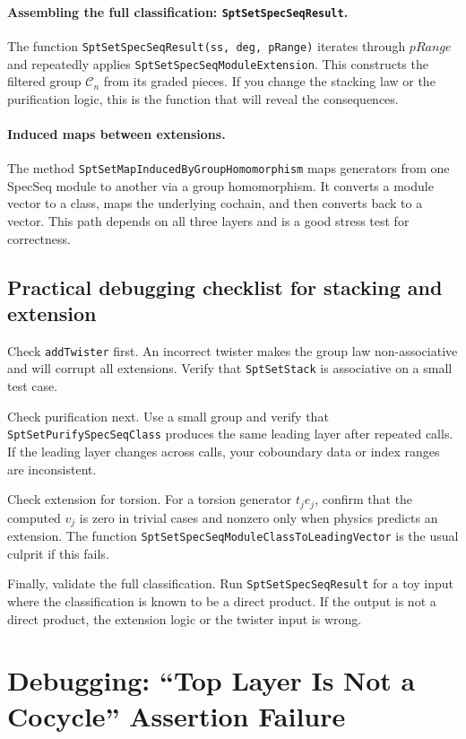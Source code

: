 \documentclass{SciPost}
\begin{document}
\paragraph{Assembling the full classification: \texttt{SptSetSpecSeqResult}.}
The function \texttt{SptSetSpecSeqResult(ss, deg, pRange)} iterates through $pRange$ and repeatedly applies \texttt{SptSetSpecSeqModuleExtension}.
This constructs the filtered group $\mathcal{C}_n$ from its graded pieces.
If you change the stacking law or the purification logic, this is the function that will reveal the consequences.

\paragraph{Induced maps between extensions.}
The method \texttt{SptSetMapInducedByGroupHomomorphism} maps generators from one SpecSeq module to another via a group homomorphism.
It converts a module vector to a class, maps the underlying cochain, and then converts back to a vector.
This path depends on all three layers and is a good stress test for correctness.

\subsection{Practical debugging checklist for stacking and extension}

Check \texttt{addTwister} first.
An incorrect twister makes the group law non-associative and will corrupt all extensions.
Verify that \texttt{SptSetStack} is associative on a small test case.

Check purification next.
Use a small group and verify that \texttt{SptSetPurifySpecSeqClass} produces the same leading layer after repeated calls.
If the leading layer changes across calls, your coboundary data or index ranges are inconsistent.

Check extension for torsion.
For a torsion generator $t_j e_j$, confirm that the computed $v_j$ is zero in trivial cases and nonzero only when physics predicts an extension.
The function \texttt{SptSetSpecSeqModuleClassToLeadingVector} is the usual culprit if this fails.

Finally, validate the full classification.
Run \texttt{SptSetSpecSeqResult} for a toy input where the classification is known to be a direct product.
If the output is not a direct product, the extension logic or the twister input is wrong.


\section{Debugging: ``Top Layer Is Not a Cocycle'' Assertion Failure}
\label{sec:debug-top-layer-not-cocycle}
\end{document}
